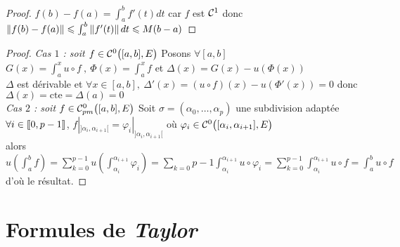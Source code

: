     \begin{proof}
    $f(b)-f(a) = \int_a^b f'(t) dt $ car $f$ est ${\mathcal{C}}^1$ donc $\left\Vert f(b)-f(a) \right\Vert \leqslant \int_a^b \left\Vert f'(t) \right\Vert dt \leqslant M(b-a)$
    \end{proof} \medskip
    
    
    \begin{proof}
    \emph{Cas $1$ : soit $f\in{\mathcal{C}}^0 \big( [a,b] ,E \big)$} Posons $\forall[a,b]$\\ 
    $G(x) = \int_a^x u\circ f ~,~ \Phi (x) = \int_a^x f$ et $\Delta (x) = G(x) - u(\Phi (x)) $ \\ 
    $\Delta$ est dérivable et $\forall x\in [a,b] , ~\Delta'(x) = (u\circ f)(x) - u(\Phi'(x)) = 0$ donc $\Delta (x) = \mathrm{cte} = \Delta (a) =0$ \\ 
    \emph{Cas $2$ : soit $f\in{\mathcal{C}_{pm}^0} \big( [a,b] ,E \big)$} Soit $\sigma = (\alpha_0 , \dots ,\alpha_p)$ une subdivision adaptée \\
    $\forall i\in {\llbracket 0,p-1 \rrbracket}$, $f|_{]\alpha_i , \alpha_{i+1}[} = \varphi_i|_{]\alpha_i , \alpha_{i+1}[}$ où $\varphi_i \in {\mathcal{C}}^0 \big( [\alpha_i , \alpha_{i+1} ],E\big) $\\ 
    alors $u\left( \int_a^b f\right) = \sum_{k=0}^{p-1} u\left( \int_{\alpha_i}^{\alpha_{i+1}} \varphi_i \right) = \sum_{k=0}{p-1} \int_{\alpha_i}^{\alpha_{i+1}} u\circ \varphi_i = \sum_{k=0}^{p-1} \int_{\alpha_i}^{\alpha_{i+1}} u\circ f =\int_a^b u\circ f$ d'où le résultat.
    \end{proof} \medskip
    
    
\section{Formules de \emph{Taylor}}

	
